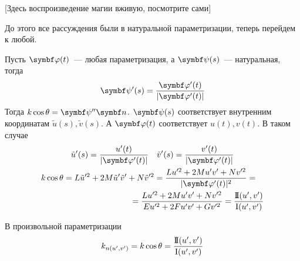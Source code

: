 \documentclass[main]{subfiles}
\begin{document}
[Здесь воспроизведение магии вживую, посмотрите сами]

До этого все рассуждения были в натуральной параметризации, теперь перейдем к любой.

Пусть $\vphi(t)$~--- любая параметризация, а $\vpsi(s)$~--- натуральная, тогда
\[\vpsi'(s) = \frac{\vphi'(t)}{|\vphi'(t)|}\]
Тогда  $k \cos\theta = \vpsi'' \vn$.
$\vpsi(s)$ соответствует внутренним координатам $\tilde{u}(s), \tilde{v}(s)$.
А $\vphi(t)$ соответствует $u(t), v(t)$.
В таком случае
\begin{gather*}
    \tilde{u}'(s) = \frac{u'(t)}{|\vphi'(t)|} \quad \tilde{v}'(s) =\frac{v'(t)}{|\vphi'(t)|}\\
    \begin{multlined}
        k \cos \theta = L \tilde{u}'^2 + 2M \tilde{u}' \tilde{v}' + N \tilde{v}'^2 = \frac{L u'^2 + 2M u'v' + Nv'^2}{|\vphi'(t)|^2} =\\
        = \frac{L u'^2 + 2M u'v' + Nv'^2}{Eu'^2 + 2F u'v' + G v'^2} = \frac{\sff(u',v')}{\fff(u',v')}
    \end{multlined}
\end{gather*}
\begin{theorem}
    В произвольной параметризации
    \[k_{n(u', v')} = k \cos \theta = \frac{\mathrm{I\!I}(u',v')}{\mathrm{I}(u',v')}\]
\end{theorem}
\end{document}
